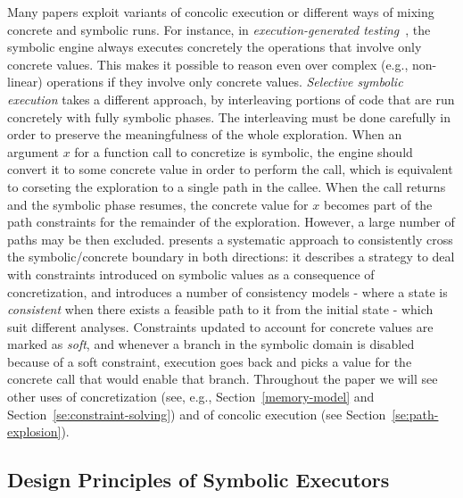 Many papers exploit variants of concolic execution or different ways of mixing concrete and symbolic runs. For instance, in {\em execution-generated testing}~\cite{KLEE-OSDI08,EXE-CCS06,CS-CACM13}, the symbolic engine always executes concretely the operations that involve only concrete values. This makes it possible to reason even over complex (e.g., non-linear) operations if they involve only concrete values. {\em Selective symbolic execution} takes a different approach, by interleaving portions of code that are run concretely with fully symbolic phases.%
The interleaving must be done carefully in order to preserve the meaningfulness of the whole exploration. When an argument $x$ for a function call to concretize is symbolic, the engine should convert it to some concrete value in order to perform the call, which is equivalent to corseting the exploration to a single path in the callee. When the call returns and the symbolic phase resumes, the concrete value for $x$ becomes part of the path constraints for the remainder of the exploration. However, a large number of paths may be then excluded. \cite{CKC-TOCS12} presents a systematic approach to consistently cross the symbolic/concrete boundary in both directions: it describes a strategy to deal with constraints introduced on symbolic values as a consequence of concretization, and introduces a number of consistency models - where a state is {\em consistent} when there exists a feasible path to it from the initial state - which suit different analyses. Constraints updated to account for concrete values are marked as {\em soft}, and whenever a branch in the symbolic domain is disabled because of a soft constraint, execution goes back and picks a value for the concrete call that would enable that branch. Throughout the paper we will see other uses of concretization (see, e.g., Section~\ref{memory-model} and Section~\ref{se:constraint-solving})  and of concolic execution (see Section~\ref{se:path-explosion}).


\subsection{Design Principles of Symbolic Executors}
\label{ss:principles}

